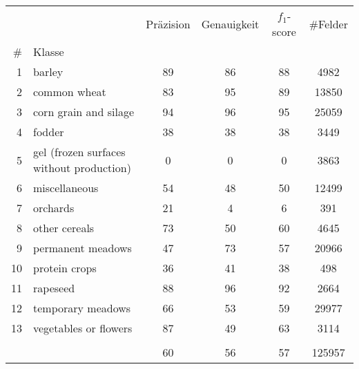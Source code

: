 \begin{tabular}{rlcccc}
\toprule
   &                       &  Präzision & Genauigkeit & $f_1$-score & \#Felder \\
\# & Klasse &            &             &             &          \\
\midrule
1 & barley &         89 &          86 &          88 &     4982 \\
2 & common wheat &         83 &          95 &          89 &    13850 \\
3 & corn grain and silage &         94 &          96 &          95 &    25059 \\
4 & fodder &         38 &          38 &          38 &     3449 \\
5 & gel (frozen surfaces without production) &          0 &           0 &           0 &     3863 \\
6 & miscellaneous &         54 &          48 &          50 &    12499 \\
7 & orchards &         21 &           4 &           6 &      391 \\
8 & other cereals &         73 &          50 &          60 &     4645 \\
9 & permanent meadows &         47 &          73 &          57 &    20966 \\
10 & protein crops &         36 &          41 &          38 &      498 \\
11 & rapeseed &         88 &          96 &          92 &     2664 \\
12 & temporary meadows &         66 &          53 &          59 &    29977 \\
13 & vegetables or flowers &         87 &          49 &          63 &     3114 \\
   &                       &            &             &             &          \\
   &                       &         60 &          56 &          57 &   125957 \\
\bottomrule
\end{tabular}

